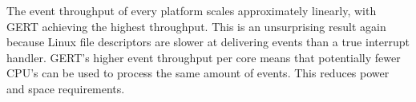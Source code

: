 The event throughput of every platform scales approximately linearly, with GERT achieving
the highest throughput. This is an unsurprising result again because Linux file descriptors
are slower at delivering events than a true interrupt handler. GERT's higher event throughput per
core means that potentially fewer CPU's can be used to process the same amount of events. This reduces
power and space requirements.

